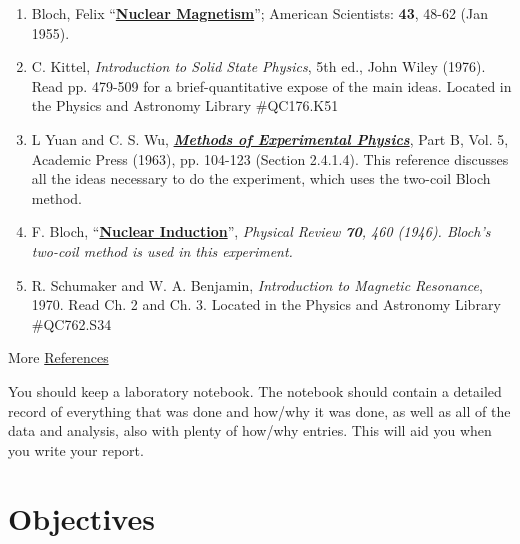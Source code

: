 \documentclass{../lab}
\begin{document}
\begin{enumerate}
    \item Bloch, Felix ``\href{http://physics111.lib.berkeley.edu/Physics111/Reprints/NMR/02-Nuclear\_Magnetism.pdf}{\textbf{Nuclear Magnetism}}''; American Scientists: \textbf{43}, 48-62 (Jan 1955).

    \item C. Kittel, \emph{Introduction to Solid State Physics}, 5th ed., John Wiley (1976). Read pp. 479-509 for a brief-quantitative expose of the main ideas. Located in the Physics and Astronomy Library \#QC176.K51

    \item L Yuan and C. S. Wu, \emph{\href{http://physics111.lib.berkeley.edu/Physics111/Reprints/NMR/01-Methods\_of\_Experimental\_Physics.pdf}{\textbf{Methods of Experimental Physics}}}, Part B, Vol. 5, Academic Press (1963), pp. 104-123 (Section 2.4.1.4). This reference discusses all the ideas necessary to do the experiment, which uses the two-coil Bloch method.

    \item F. Bloch, ``\href{http://physics111.lib.berkeley.edu/Physics111/Reprints/NMR/03-Nuclear_Induction.pdf}{\textbf{Nuclear Induction}}'', \emph{Physical Review \textbf{70}, 460 (1946). Bloch's two-coil method is used in this experiment. }

    \item R. Schumaker and W. A. Benjamin, \emph{Introduction to Magnetic Resonance}, 1970. Read Ch. 2 and Ch. 3. Located in the Physics and Astronomy Library \#QC762.S34
\end{enumerate}

More \hyperref[References]{References}

You should keep a laboratory notebook. The notebook should contain a detailed record of everything that was done and how/why it was done, as well as all of the data and analysis, also with plenty of how/why entries. This will aid you when you write your report.

\section{Objectives}
\end{document}
